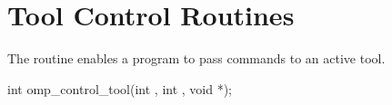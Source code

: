 %
%
%
%
%
%
%
%
%
%
%
%
%


\section{Tool Control Routines}
\label{sec:control_tool}

\summary
The  routine enables a program to
pass commands to an active tool.

\format
\begin{ccppspecific}
\begin{ompcFunction}
int omp_control_tool(int , int , void *);
\end{ompcFunction}
\end{ccppspecific}

